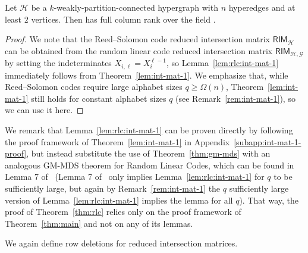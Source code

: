 \documentclass{article}[11pt]
\begin{document}
\begin{lemma}
  Let $\mathcal{H}$ be a $k$-weakly-partition-connected hypergraph with $n$ hyperedges and at least $2$ vertices.
  Then  has full column rank over the field .
  \label{lem:rlc:int-mat-1}
\end{lemma}
\begin{proof}
We note that the Reed--Solomon code reduced intersection matrix $\textsf{RIM}_\mathcal{H}$ can be obtained from the random linear code reduced intersection matrix $\textsf{RIM}_{\mathcal{H},\mathcal{G}}$ by setting the indeterminates $X_{i,\ell} = X_i^{\ell-1}$, so Lemma~\ref{lem:rlc:int-mat-1} immediately follows from Theorem~\ref{lem:int-mat-1}.
We emphasize that, while Reed--Solomon codes require large alphabet sizes $q\ge \Omega(n)$, Theorem~\ref{lem:int-mat-1} still holds for constant alphabet sizes $q$ (see Remark~\ref{rem:int-mat-1}), so we can use it here.
\end{proof}

We remark that Lemma~\ref{lem:rlc:int-mat-1} can be proven directly by following the proof framework of Theorem~\ref{lem:int-mat-1} in Appendix~\ref{subapp:int-mat-1-proof}, but instead substitute the use of Theorem~\ref{thm:gm-mds} with an analogous GM-MDS theorem for Random Linear Codes, which can be found in Lemma 7 of~\cite{DSY15} (Lemma 7 of~\cite{DSY15} only implies Lemma~\ref{lem:rlc:int-mat-1} for $q$ to be sufficiently large, but again by Remark~\ref{rem:int-mat-1} the $q$ sufficiently large version of Lemma~\ref{lem:rlc:int-mat-1} implies the lemma for all $q$). That way, the proof of Theorem~\ref{thm:rlc} relies only on the proof framework of Theorem~\ref{thm:main} and not on any of its lemmas.

We again define row deletions for reduced intersection matrices.
\end{document}
